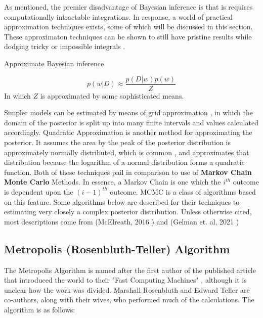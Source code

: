  As mentioned, the premier disadvantage of Bayesian inference is that is requires computationally intractable integrations.  In response, a world of practical approximation techniques exists, some of which will be discussed in this section.  These approximaton techniques can be shown to still have pristine results while dodging tricky or impossible integrals \cite{tipping2004bayesian}.

 Approximate Bayesian inference

$$
p(w|D) \approx \frac{p(D|w)p(w)}{Z}
$$
In which $Z$ is approximated by some sophisticated means.


Simpler models can be estimated by means of grid approximation \cite{mcelreath2016statistical}, in which the domain of the posterior is split up into many finite intervals and values calculated accordingly.  Quadratic Approximation is another method for approximating the posterior.  It assumes the area by the peak of the posterior distribution is approximately normally distributed, which is common \cite{mcelreath2016statistical}, and approximates that distribution because the logarithm of a normal distribution forms a quadratic function.  Both of these techniques pail in comparison to use of \textbf{Markov Chain Monte Carlo} Methods.  In essence, a Markov Chain is one which the $i^{th}$ outcome is dependent upon the $(i-1)^{th}$ outcome.  MCMC is a class of algorithms based on this feature.  Some algorithms below are described for their techniques to estimating very closely a complex posterior distribution.  Unless otherwise cited, most descriptions come from (McElreath, 2016 \cite{mcelreath2016statistical}) and (Gelman et. al, 2021 \cite{gelmanbayesian3}) 



\subsection{Metropolis (Rosenbluth-Teller) Algorithm}

The Metropolis Algorithm is named after the first author of the published article that introduced the world to their "Fast Computing Machines" \cite{metropolis1953equation}, although it is unclear how the work was divided. Marshall Rosenbluth and Edward Teller are co-authors, along with their wives, who performed much of the calculations.  The algorithm is as follows:

